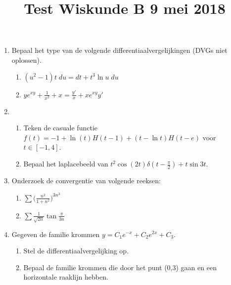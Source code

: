 \documentclass{article}
\begin{document}
\title{Test Wiskunde B 9 mei 2018}
\date{}
\author{}
\maketitle

\begin{enumerate}
	\item{Bepaal het type van de volgende differentiaalvergelijkingen (DVGs niet oplossen).
        \begin{enumerate}
         \item $(u^2 - 1)t\;du = dt + t^3\ln u\;du$
         \item $ye^{xy} + \frac{1}{x^2} + x = \frac{y'}{x} + xe^{xy}y'$
        \end{enumerate}
	}
	\item{
        \begin{enumerate}
         \item Teken de casuale functie $f(t) = -1 + \ln(t)H(t - 1) + (t - \ln t)H(t - e)$ voor $t \in [-1, 4]$.
        \item Bepaal het laplacebeeld van $t^2\cos(2t)\delta(t - \frac{\pi}{2}) + t\sin 3t$.
        \end{enumerate}
	}
	\item{
        Onderzoek de convergentie van volgende reeksen:
        \begin{enumerate}
            \item $\sum \big(\frac{n^2}{1+n^2}\big)^{3n^3}$
            \item $\sum \frac{1}{\sqrt{2n}}\tan \frac{\pi}{3n}$
        \end{enumerate}
	}
	\item{
        Gegeven de familie krommen $y = C_1e^{-x} + C_2e^{2x} + C_3$.
        \begin{enumerate}
            \item Stel de differentiaalvergelijking op.
            \item Bepaal de familie krommen die door het punt (0,3) gaan en een horizontale raaklijn hebben.
        \end{enumerate}
	}
\end{enumerate}
\end{document}
